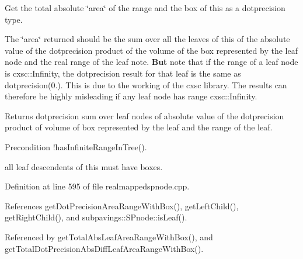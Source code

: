 \-Get the total absolute \char`\"{}area\char`\"{} of the range and the box of this as a dotprecision type. 

\-The \char`\"{}area\char`\"{} returned should be the sum over all the leaves of this of the absolute value of the dotprecision product of the volume of the box represented by the leaf node and the real range of the leaf note. {\bfseries \-But} note that if the range of a leaf node is cxsc\-::\-Infinity, the dotprecision result for that leaf is the same as dotprecision(0.). \-This is due to the working of the cxsc library. \-The results can therefore be highly misleading if any leaf node has range cxsc\-::\-Infinity.

\begin{DoxyReturn}{\-Returns}
dotprecision sum over leaf nodes of absolute value of the dotprecision product of volume of box represented by the leaf and the range of the leaf. 
\end{DoxyReturn}
\begin{DoxyPrecond}{\-Precondition}
!has\-Infinite\-Range\-In\-Tree(). 

all leaf descendents of this must have boxes. 
\end{DoxyPrecond}


\-Definition at line 595 of file realmappedspnode.\-cpp.



\-References get\-Dot\-Precision\-Area\-Range\-With\-Box(), get\-Left\-Child(), get\-Right\-Child(), and subpavings\-::\-S\-Pnode\-::is\-Leaf().



\-Referenced by get\-Total\-Abs\-Leaf\-Area\-Range\-With\-Box(), and get\-Total\-Dot\-Precision\-Abs\-Diff\-Leaf\-Area\-Range\-With\-Box().


